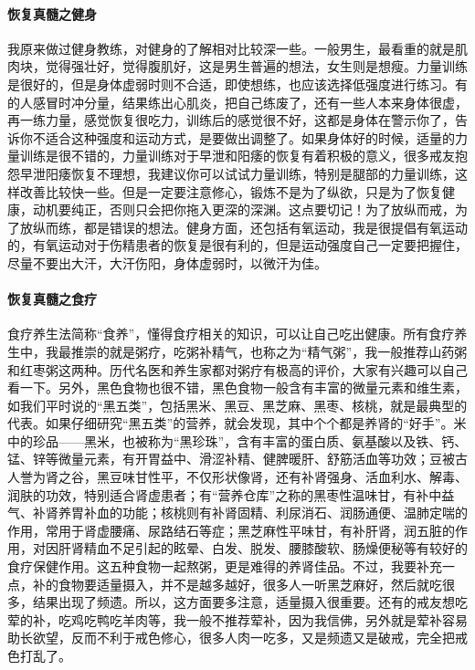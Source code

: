 \documentclass{ctexart}
\begin{document}
\paragraph{恢复真髓之健身}

我原来做过健身教练，对健身的了解相对比较深一些。一般男生，最看重的就是肌肉块，觉得强壮好，觉得腹肌好，这是男生普遍的想法，女生则是想瘦。力量训练是很好的，但是身体虚弱时则不合适，即使想练，也应该选择低强度进行练习。有的人感冒时冲分量，结果练出心肌炎，把自己练废了，还有一些人本来身体很虚，再一练力量，感觉恢复很吃力，训练后的感觉很不好，这都是身体在警示你了，告诉你不适合这种强度和运动方式，是要做出调整了。如果身体好的时候，适量的力量训练是很不错的，力量训练对于早泄和阳痿的恢复有着积极的意义，很多戒友抱怨早泄阳痿恢复不理想，我建议你可以试试力量训练，特别是腿部的力量训练，这样改善比较快一些。但是一定要注意修心，锻炼不是为了纵欲，只是为了恢复健康，动机要纯正，否则只会把你拖入更深的深渊。这点要切记！为了放纵而戒，为了放纵而练，都是错误的想法。健身方面，还包括有氧运动，我是很提倡有氧运动的，有氧运动对于伤精患者的恢复是很有利的，但是运动强度自己一定要把握住，尽量不要出大汗，大汗伤阳，身体虚弱时，以微汗为佳。

\paragraph{恢复真髓之食疗}

食疗养生法简称“食养”，懂得食疗相关的知识，可以让自己吃出健康。所有食疗养生中，我最推崇的就是粥疗，吃粥补精气，也称之为“精气粥”，我一般推荐山药粥和红枣粥这两种。历代名医和养生家都对粥疗有极高的评价，大家有兴趣可以自己看一下。另外，黑色食物也很不错，黑色食物一般含有丰富的微量元素和维生素，如我们平时说的“黑五类”，包括黑米、黑豆、黑芝麻、黑枣、核桃，就是最典型的代表。如果仔细研究“黑五类”的营养，就会发现，其中个个都是养肾的“好手”。米中的珍品——黑米，也被称为“黑珍珠”，含有丰富的蛋白质、氨基酸以及铁、钙、锰、锌等微量元素，有开胃益中、滑涩补精、健脾暖肝、舒筋活血等功效；豆被古人誉为肾之谷，黑豆味甘性平，不仅形状像肾，还有补肾强身、活血利水、解毒、润肤的功效，特别适合肾虚患者；有“营养仓库”之称的黑枣性温味甘，有补中益气、补肾养胃补血的功能；核桃则有补肾固精、利尿消石、润肠通便、温肺定喘的作用，常用于肾虚腰痛、尿路结石等症；黑芝麻性平味甘，有补肝肾，润五脏的作用，对因肝肾精血不足引起的眩晕、白发、脱发、腰膝酸软、肠燥便秘等有较好的食疗保健作用。这五种食物一起熬粥，更是难得的养肾佳品。不过，我要补充一点，补的食物要适量摄入，并不是越多越好，很多人一听黑芝麻好，然后就吃很多，结果出现了频遗。所以，这方面要多注意，适量摄入很重要。还有的戒友想吃荤的补，吃鸡吃鸭吃羊肉等，我一般不推荐荤补，因为我信佛，另外就是荤补容易助长欲望，反而不利于戒色修心，很多人肉一吃多，又是频遗又是破戒，完全把戒色打乱了。
\end{document}
